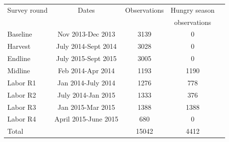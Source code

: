 \begin{tabular}{l cc cc }
\hline
Survey round & Dates & Observations & Hungry season  \\ 
 & & & observations  \\ 
Baseline & Nov 2013-Dec 2013 & 3139 & 0 \\ 
Harvest     & July 2014-Sept 2014 & 3028 &  0 \\ 
Endline & July 2015-Sept 2015 & 3005 & 0 \\ 
Midline & Feb 2014-Apr 2014 & 1193 & 1190 \\ 
Labor R1 & Jan 2014-July 2014 & 1276 & 778 \\ 
Labor R2 & July 2014-Jan 2015 & 1333 & 376 \\ 
Labor R3 & Jan 2015-Mar 2015 & 1388 & 1388 \\ 
Labor R4 & April 2015-June 2015 & 680 & 0 \\ 
Total & & 15042 & 4412 \\ 
\hline
\end{tabular}

